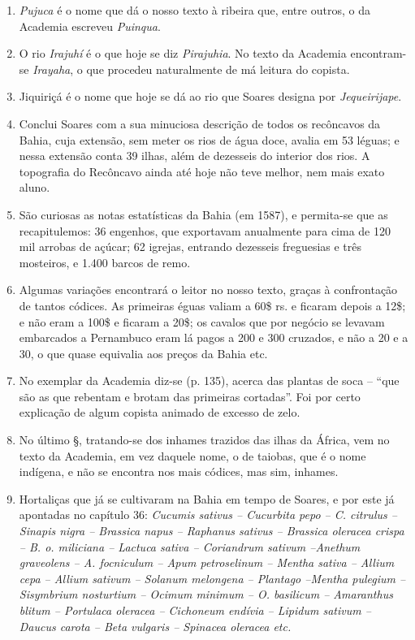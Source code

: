 \begin{enumerate}
\item \textit{Pujuca} é o nome que dá o nosso texto à ribeira que, entre outros, o da Academia 
escreveu \textit{Puinqua}.

\item O rio \textit{Irajuhí} é o que hoje se diz \textit{Pirajuhia}. No texto da Academia encontram-se  
\textit{Irayaha}, o que procedeu naturalmente de má leitura do copista.

\item Jiquiriçá é o nome que hoje se dá ao rio que Soares designa por \textit{Jequeirijape}.

\item Conclui Soares com a sua minuciosa descrição de todos os recôncavos da Bahia, 
cuja extensão, sem meter os rios de água doce, avalia em 53 léguas; e nessa extensão 
conta 39 ilhas, além de dezesseis do interior dos rios. A topografia do Recôncavo ainda até 
hoje não teve melhor, nem mais exato aluno.

\item São curiosas as notas estatísticas da Bahia (em 1587), e permita-se que as 
recapitulemos: 36 engenhos, que exportavam anualmente para cima de 120 mil arrobas 
de açúcar; 62 igrejas, entrando dezesseis freguesias e três mosteiros, e 1.400 barcos de remo.

\item Algumas variações encontrará o leitor no nosso texto, graças à confrontação de 
tantos códices. As primeiras éguas valiam a 60\$ rs. e ficaram depois a 12\$; e não eram 
a 100\$ e ficaram a 20\$; os cavalos que por negócio se levavam embarcados a 
Pernambuco eram lá pagos a 200 e 300 cruzados, e não a 20 e a 30, o que quase 
equivalia aos preços da Bahia etc.

\item No exemplar da Academia diz-se (p. 135), acerca das plantas de soca -- ``que são 
as que rebentam e brotam das primeiras cortadas''. Foi por certo explicação de algum 
copista animado de excesso de zelo.

\item No último §, tratando-se dos inhames trazidos das ilhas da África, vem no texto da 
Academia, em vez daquele nome, o de taiobas, que é o nome indígena, e não se 
encontra nos mais códices, mas sim, inhames.

\item  Hortaliças que já se cultivaram na Bahia em tempo de Soares, e
por este já apontadas no capítulo 36: \textit{Cucumis sativus -- Cucurbita pepo --
C. citrulus -- Sinapis nigra -- Brassica napus -- Raphanus sativus -- Brassica
oleracea crispa -- B. o. miliciana -- Lactuca sativa -- Coriandrum sativum
--Anethum graveolens -- A. focniculum -- Apum petroselinum -- Mentha sativa -- 
Allium cepa -- Allium sativum -- Solanum melongena -- Plantago
--Mentha pulegium -- Sisymbrium nosturtium -- Ocimum minimum -- O. basilicum -- 
Amaranthus blitum -- Portulaca oleracea -- Cichoneum endívia
-- Lipidum sativum -- Daucus carota -- Beta vulgaris -- Spinacea oleracea etc.}


\end{enumerate}
